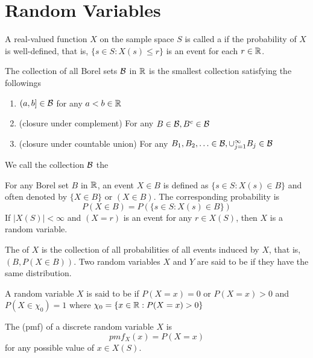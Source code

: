 \documentclass[11pt]{article}
\begin{document}
\section{Random Variables}
A real-valued function $X$ on the sample space $S$ is called a  if the probability of $X$ is well-defined, that is, $\{ s \in S: X(s) \leq r\}$ is an event for each $r \in \mathbb{R}$.

The collection of all Borel sets $\mathcal{B}$ in $\mathbb{R}$ is the smallest collection satisfying the followings
\begin{enumerate}
	\item $(a,b] \in \mathcal{B}$ for any $a < b \in \mathbb{R}$
	\item (closure under complement) For any $B \in \mathcal{B}, B^c \in \mathcal{B}$
	\item (closure under countable union) For any $B_1, B_2, \hdots \in \mathcal{B}, \cup_{j=1}^\infty B_j \in \mathcal{B}$
\end{enumerate}
We call the collection $\mathcal{B}$ the 

For any Borel set $B$ in $\mathbb{R}$, an event $X \in B$ is defined as $\{s \in S: X(s) \in B\}$ and often denoted by $\{ X \in B\}$ or $(X \in B)$. The corresponding probability is
$$P(X \in B) = P(\{ s \in S: X(s) \in B\})$$
\lemma 
If $|X(S)| < \infty$ and $(X = r)$ is an event for any $r \in X(S)$, then $X$ is a random variable.

The  of $X$ is the collection of all probabilities of all events induced by $X$, that is, $(B, P(X \in B))$. Two random variables $X$ and $Y$ are said to be  if they have the same distribution.

\remark
{}

A random variable $X$ is said to be  if $P(X = x) = 0$ or $P(X = x) > 0$ and $P(X \in \chi_0) = 1$ where $\chi_0 = \{ x \in \mathbb{R}: P(X = x) > 0\}$

The  (pmf) of a discrete random variable $X$ is
$$pmf_X(x) = P(X=x)$$
for any possible value of $x \in X(S)$.
\end{document}
